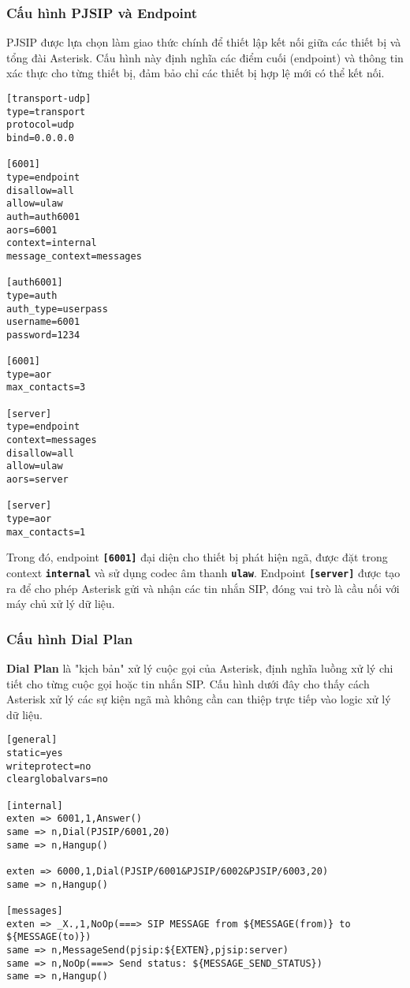 \subsubsection{Cấu hình PJSIP và Endpoint}

PJSIP được lựa chọn làm giao thức chính để thiết lập kết nối giữa các thiết bị và tổng đài Asterisk. Cấu hình này định nghĩa các điểm cuối (endpoint) và thông tin xác thực cho từng thiết bị, đảm bảo chỉ các thiết bị hợp lệ mới có thể kết nối.

\begin{verbatim}
[transport-udp]
type=transport
protocol=udp
bind=0.0.0.0

[6001]
type=endpoint
disallow=all
allow=ulaw
auth=auth6001
aors=6001
context=internal
message_context=messages

[auth6001]
type=auth
auth_type=userpass
username=6001
password=1234

[6001]
type=aor
max_contacts=3

[server]
type=endpoint
context=messages
disallow=all
allow=ulaw
aors=server

[server]
type=aor
max_contacts=1
\end{verbatim}

Trong đó, endpoint \textbf{\texttt{[6001]}} đại diện cho thiết bị phát hiện ngã, được đặt trong context \textbf{\texttt{internal}} và sử dụng codec âm thanh \textbf{\texttt{ulaw}}. Endpoint \textbf{\texttt{[server]}} được tạo ra để cho phép Asterisk gửi và nhận các tin nhắn SIP, đóng vai trò là cầu nối với máy chủ xử lý dữ liệu.

\subsubsection{Cấu hình Dial Plan}

\textbf{Dial Plan} là "kịch bản" xử lý cuộc gọi của Asterisk, định nghĩa luồng xử lý chi tiết cho từng cuộc gọi hoặc tin nhắn SIP. Cấu hình dưới đây cho thấy cách Asterisk xử lý các sự kiện ngã mà không cần can thiệp trực tiếp vào logic xử lý dữ liệu.

\begin{verbatim}
[general]
static=yes
writeprotect=no
clearglobalvars=no

[internal]
exten => 6001,1,Answer()
same => n,Dial(PJSIP/6001,20)
same => n,Hangup()

exten => 6000,1,Dial(PJSIP/6001&PJSIP/6002&PJSIP/6003,20)
same => n,Hangup()

[messages]
exten => _X.,1,NoOp(===> SIP MESSAGE from ${MESSAGE(from)} to ${MESSAGE(to)})
same => n,MessageSend(pjsip:${EXTEN},pjsip:server)
same => n,NoOp(===> Send status: ${MESSAGE_SEND_STATUS})
same => n,Hangup()
\end{verbatim}


